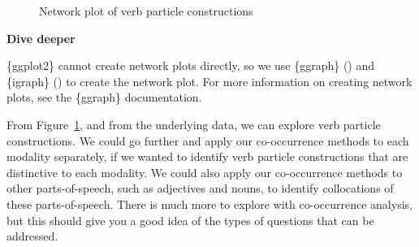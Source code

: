 \documentclass[
  letterpaper,
  krantz1]{latex/krantz-mod}
\theoremstyle{definition}
\theoremstyle{definition}
\theoremstyle{remark}
\begin{document}
\begin{figure}[!htb]


\caption{\label{fig-explore-masc-verb-part-network}Network plot of verb
particle constructions}

\end{figure}%

\begin{tcolorbox}[enhanced jigsaw, leftrule=.75mm, colframe=quarto-callout-color-frame, left=2mm, colback=white, toprule=.15mm, breakable, arc=.35mm, opacityback=0, bottomrule=.15mm, rightrule=.15mm]

\textbf{ Dive deeper}

\{ggplot2\} cannot create network plots directly, so we use \{ggraph\}
() and \{igraph\}
() to create the network
plot. For more information on creating network plots, see the \{ggraph\}
documentation.

\end{tcolorbox}

From Figure~\ref{fig-explore-masc-verb-part-network}, and from the
underlying data, we can explore verb particle constructions. We could go
further and apply our co-occurrence methods to each modality separately,
if we wanted to identify verb particle constructions that are
distinctive to each modality. We could also apply our co-occurrence
methods to other parts-of-speech, such as adjectives and nouns, to
identify collocations of these parts-of-speech. There is much more to
explore with co-occurrence analysis, but this should give you a good
idea of the types of questions that can be addressed.
\end{document}
